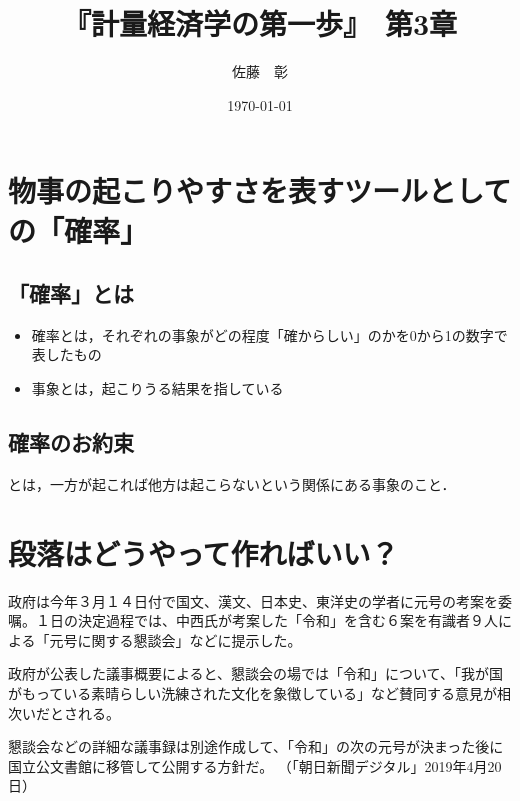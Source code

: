 \documentclass{jsarticle}
\title{『計量経済学の第一歩』　第3章}
\author{佐藤　彰}
\date{\today}
\begin{document}


\maketitle


\section{物事の起こりやすさを表すツールとしての「確率」}


\subsection{「確率」とは}


\begin{itemize}
\item 確率とは，それぞれの事象がどの程度「確からしい」のかを0から1の数字で表したもの
\item 事象とは，起こりうる結果を指している
\end{itemize}

\subsection{確率のお約束}
とは，一方が起これば他方は起こらないという関係にある事象のこと．

\section{段落はどうやって作ればいい？}
政府は今年３月１４日付で国文、漢文、日本史、東洋史の学者に元号の考案を委嘱。１日の決定過程では、中西氏が考案した「令和」を含む６案を有識者９人による「元号に関する懇談会」などに提示した。

政府が公表した議事概要によると、懇談会の場では「令和」について、「我が国がもっている素晴らしい洗練された文化を象徴している」など賛同する意見が相次いだとされる。

懇談会などの詳細な議事録は別途作成して、「令和」の次の元号が決まった後に国立公文書館に移管して公開する方針だ。
（「朝日新聞デジタル」2019年4月20日）
\end{document}
